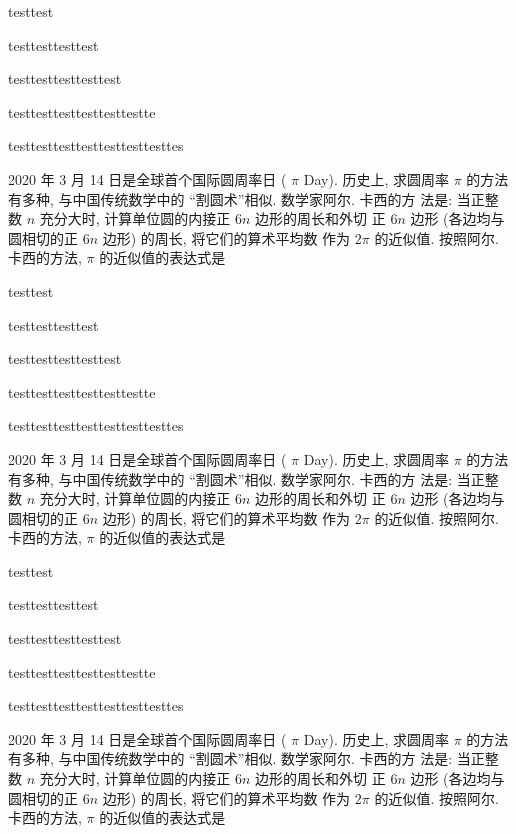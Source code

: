 \documentclass{ctexart}
\begin{document}
    \begin{xchoices}[items = 3]
      \item testtest
      \item testtesttesttest
      \item testtesttesttesttest
      \item testtesttesttesttesttestte
      \item testtesttesttesttesttesttesttes
    \end{xchoices}

    2020 年 3 月 14 日是全球首个国际圆周率日 ( $\pi$ Day). 历史上, 求圆周率 $\pi$ 的方法有多种, 与中国传统数学中的 “割圆术”相似. 数学家阿尔. 卡西的方 法是: 当正整数 $n$ 充分大时, 计算单位圆的内接正 $6 n$ 边形的周长和外切 正 $6 n$ 边形 (各边均与圆相切的正 $6 n$ 边形) 的周长, 将它们的算术平均数 作为 $2 \pi$ 的近似值. 按照阿尔. 卡西的方法, $\pi$ 的近似值的表达式是 \paren

    \begin{xchoices}[items = 4]
      \item testtest
      \item testtesttesttest
      \item testtesttesttesttest
      \item testtesttesttesttesttestte
      \item testtesttesttesttesttesttesttes
    \end{xchoices}

    2020 年 3 月 14 日是全球首个国际圆周率日 ( $\pi$ Day). 历史上, 求圆周率 $\pi$ 的方法有多种, 与中国传统数学中的 “割圆术”相似. 数学家阿尔. 卡西的方 法是: 当正整数 $n$ 充分大时, 计算单位圆的内接正 $6 n$ 边形的周长和外切 正 $6 n$ 边形 (各边均与圆相切的正 $6 n$ 边形) 的周长, 将它们的算术平均数 作为 $2 \pi$ 的近似值. 按照阿尔. 卡西的方法, $\pi$ 的近似值的表达式是 \paren

    \begin{xchoices}[items = 5]
      \item testtest
      \item testtesttesttest
      \item testtesttesttesttest
      \item testtesttesttesttesttestte
      \item testtesttesttesttesttesttesttes
    \end{xchoices}

    2020 年 3 月 14 日是全球首个国际圆周率日 ( $\pi$ Day). 历史上, 求圆周率 $\pi$ 的方法有多种, 与中国传统数学中的 “割圆术”相似. 数学家阿尔. 卡西的方 法是: 当正整数 $n$ 充分大时, 计算单位圆的内接正 $6 n$ 边形的周长和外切 正 $6 n$ 边形 (各边均与圆相切的正 $6 n$ 边形) 的周长, 将它们的算术平均数 作为 $2 \pi$ 的近似值. 按照阿尔. 卡西的方法, $\pi$ 的近似值的表达式是 \paren
\end{document}

